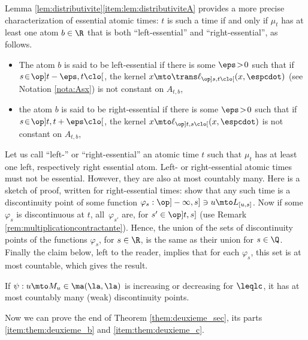 \begin{rem}\label{rem:essentiel_divers_bis}Lemma \ref{lem:distributivite}\eqref{item:lem:distributiviteA} provides a more precise characterization of essential atomic times: $t$ is such a time if and only if $\mu_t$ has at least one atom $b\in\R$ that is both ``left-essential'' and ``right-essential'', as follows.
\begin{itemize}
\item
The atom $b$ is said to be left-essential if there is some $\eps\!>\!0$ such that if $s\!\in\!\op]t-\eps,t\clo[$, the kernel $x\mto \trans\ell_{\op]s,t\clo[}(x,\espcdot)$ (see Notation \ref{nota:Asx}) is not constant on $A_{t,b}$,

\item
the atom $b$ is said to be right-essential if there is some $\eps\!>\!0$ such that if $s\!\in\!\op]t,t+\eps\clo[$, the kernel $x\mto\ell_{\op]t,s\clo[}(x,\espcdot)$ is not constant on $A_{t,b}$,
\end{itemize}
Let us call ``left-'' or ``right-essential'' an atomic time $t$ such that $\mu_t$ has at least one left, respectively right essential atom. Left- or right-essential atomic times must not be essential. However, they are also at most countably many. Here is a sketch of proof, written for right-essential times: show that any such time is a discontinuity point of some function $\varphi_s:\op]-\infty,s]\ni u\mto L_{[u,s]}$. Now if some $\varphi_s$ is discontinuous at $t$, all~$\varphi_{s'}$ are, for $s'\in\op]t,s]$ (use Remark \ref{rem:multiplicationcontractante}). Hence, the union of the sets of discontinuity points of the functions $\varphi_s$, for $s\in\R$, is the same as their union for $s\in\Q$. Finally the claim below, left to the reader, implies that for each $\varphi_s$, this set is at most countable, which gives the result.

\begin{claim}
If $\psi:u\mto M_u\in \ma(\la,\la)$ is increasing or decreasing for $\leqlc$, it has at most countably many (weak) discontinuity points.
\end{claim}
\end{rem}

Now we can prove the end of Theorem \ref{them:deuxieme_sec}, \ie its parts \eqref{item:them:deuxieme_b} and \eqref{item:them:deuxieme_c}.

